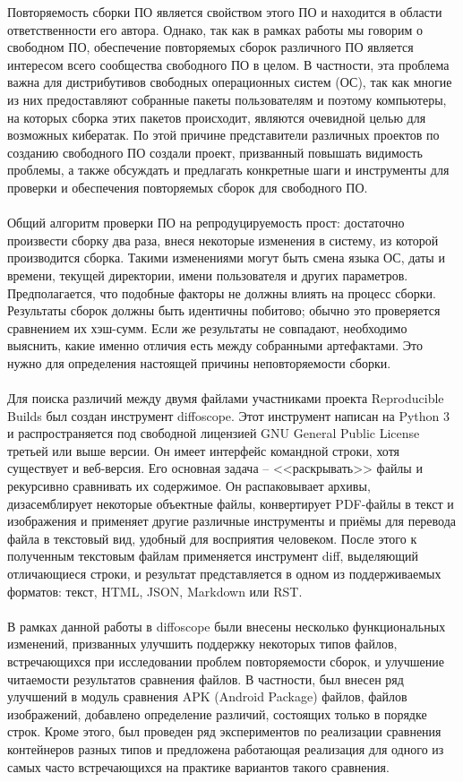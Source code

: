 Повторяемость сборки ПО является свойством этого ПО и находится в области ответственности его автора. Однако, так как в рамках работы мы говорим о свободном ПО, обеспечение повторяемых сборок различного ПО является интересом всего сообщества свободного ПО в целом. В частности, эта проблема важна для дистрибутивов свободных операционных систем (ОС), так как многие из них предоставляют собранные пакеты пользователям и поэтому компьютеры, на которых сборка этих пакетов происходит, являются очевидной целью для возможных кибератак. По этой причине представители различных проектов по созданию свободного ПО создали проект, призванный повышать видимость проблемы, а также обсуждать и предлагать конкретные шаги и инструменты для проверки и обеспечения повторяемых сборок для свободного ПО.\\\\
Общий алгоритм проверки ПО на репродуцируемость прост: достаточно произвести сборку два раза, внеся некоторые изменения в систему, из которой производится сборка. Такими изменениями могут быть смена языка ОС, даты и времени, текущей директории, имени пользователя и других параметров. Предполагается, что подобные факторы не должны влиять на процесс сборки. Результаты сборок должны быть идентичны побитово; обычно это проверяется сравнением их хэш-сумм. Если же результаты не совпадают, необходимо выяснить, какие именно отличия есть между собранными артефактами. Это нужно для определения настоящей причины неповторяемости сборки.\\\\
Для поиска различий между двумя файлами участниками проекта {Reproducible Builds} был создан инструмент diffoscope. Этот инструмент написан на Python 3 и распространяется под свободной лицензией GNU General Public License третьей или выше версии. Он имеет интерфейс командной строки, хотя существует и веб-версия. Его основная задача -- <<раскрывать>> файлы и рекурсивно сравнивать их содержимое. Он распаковывает архивы, дизасемблирует некоторые объектные файлы, конвертирует PDF-файлы в текст и изображения и применяет другие различные инструменты и приёмы для перевода файла в текстовый вид, удобный для восприятия человеком. После этого к полученным текстовым файлам применяется инструмент diff, выделяющий отличающиеся строки, и результат представляется в одном из поддерживаемых форматов: текст, HTML, JSON, Markdown или RST.\\\\
В рамках данной работы в diffoscope были внесены несколько функциональных изменений, призванных улучшить поддержку некоторых типов файлов, встречающихся при исследовании проблем повторяемости сборок, и улучшение читаемости результатов сравнения файлов. В частности, был внесен ряд улучшений в модуль сравнения APK (Android Package) файлов, файлов изображений, добавлено определение различий, состоящих только в порядке строк. Кроме этого, был проведен ряд экспериментов по реализации сравнения контейнеров разных типов и предложена работающая реализация для одного из самых часто встречающихся на практике вариантов такого сравнения.\\\\
